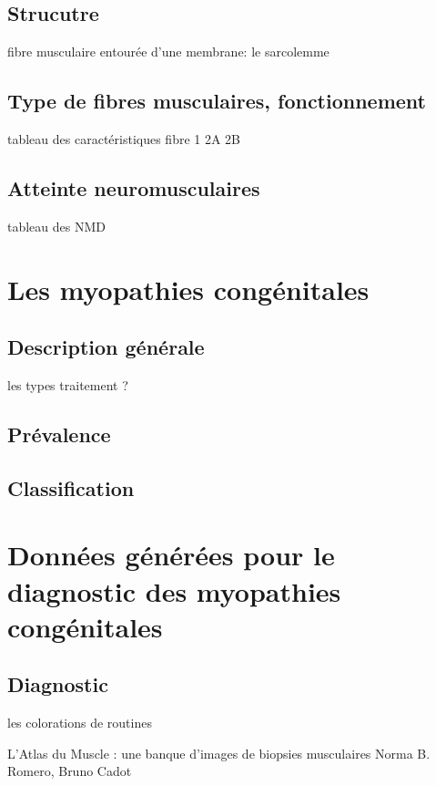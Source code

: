 \subsection{Strucutre}

fibre musculaire entourée d'une membrane: le sarcolemme

\subsection{Type de fibres musculaires, fonctionnement}
tableau des caractéristiques fibre 1 2A 2B

\subsection{Atteinte neuromusculaires}
tableau des NMD

\section{Les myopathies congénitales}

\subsection{Description générale}
les types
traitement ?

\subsection{Prévalence}
\subsection{Classification}


\section{Données générées pour le diagnostic des myopathies congénitales}
\subsection{Diagnostic}
les colorations de routines

L’Atlas du Muscle : une banque d’images
de biopsies musculaires
Norma B. Romero, Bruno Cadot

